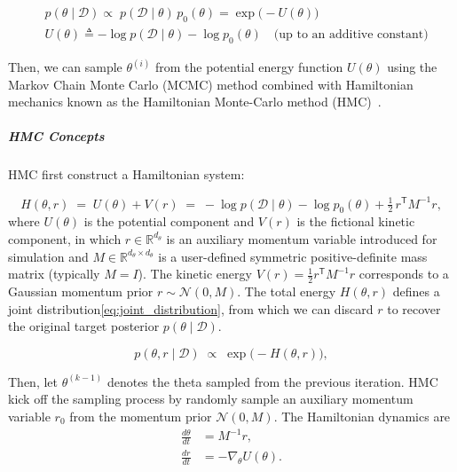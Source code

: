 \documentclass[preprint,12pt]{elsarticle}
\begin{document}
\begin{align}
    &p(\theta\mid\mathcal D)
    \propto\;
    p(\mathcal D\mid\theta)\,p_0(\theta)
    = \exp\!\bigl(-U(\theta)\bigr)
    \label{eq:hmc_posterior} \\[1ex]
    &U(\theta)
    \triangleq -\log p(\mathcal D\mid\theta) - \log p_0(\theta)
    \quad \text{(up to an additive constant)}
    \label{eq:potential}
\end{align}

\noindent
Then, we can sample $\theta^{(i)}$ from the potential energy function $U(\theta)$ using the Markov Chain Monte Carlo (MCMC) method combined with Hamiltonian mechanics known as the Hamiltonian Monte-Carlo method (HMC)~\cite{neal_mcmc_2012, betancourt_conceptual_2018}.

\subparagraph{HMC Concepts}
HMC first construct a Hamiltonian system:

\begin{equation}
  H(\theta, r)
  \;=\;
  U(\theta) + V(r)
  \;=\;
  -\log p(\mathcal D \mid \theta)
  - \log p_0(\theta)
  + \tfrac{1}{2}\, r^{\mathsf{T}} M^{-1} r,
  \label{eq:hamiltonian_full}
\end{equation}
\noindent
where $U(\theta)$ is the potential component and $V(r)$ is the fictional kinetic component, in which \( r \in \mathbb{R}^{d_\theta} \) is an auxiliary momentum variable introduced for simulation and \( M \in \mathbb{R}^{d_\theta \times d_\theta} \) is a user-defined symmetric positive-definite mass matrix (typically \( M = I \)). The kinetic energy \( V(r) = \tfrac{1}{2} r^{\mathsf T} M^{-1} r \) corresponds to a Gaussian momentum prior \( r \sim \mathcal{N}(0, M) \). The total energy \( H(\theta, r) \) defines a joint distribution\eqref{eq:joint_distribution}, from which we can discard \( r \) to recover the original target posterior \( p(\theta \mid \mathcal D) \).

\begin{equation}
  p(\theta, r \mid \mathcal D)
  \;\propto\;
  \exp\bigl(-H(\theta, r)\bigr),
  \label{eq:joint_distribution}
\end{equation}

Then, let $\theta^{(k-1)}$ denotes the theta sampled from the previous iteration. HMC kick off the sampling process by randomly sample an auxiliary momentum variable $r_0$ from the momentum prior $\mathcal N(0, M)$. The Hamiltonian dynamics are
\begin{subequations}
\label{eq:hmc_ode}
\begin{align}
  \frac{d\theta}{dt} &= M^{-1} r, \label{eq:hmc_ode_theta}\\
  \frac{dr}{dt}      &= -\nabla_{\!\theta} U(\theta). \label{eq:hmc_ode_r}
\end{align}
\end{subequations}
\end{document}
